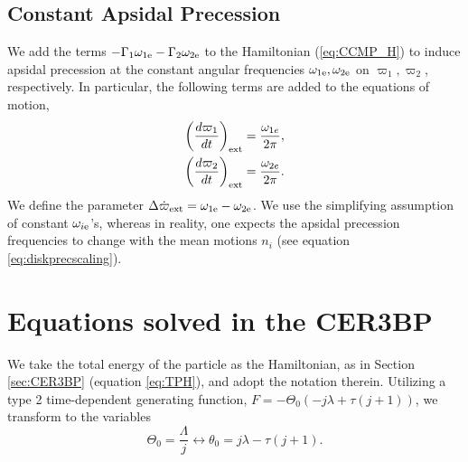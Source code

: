 \documentclass[usenatbib,twocolumn]{mnras}
\begin{document}
\subsection{Constant Apsidal Precession}
We add the terms $-\Gamma_1\omega_{1\rm e}-\Gamma_2\omega_{2\rm e}$ to the Hamiltonian (\ref{eq:CCMP_H}) to induce apsidal precession at the constant angular frequencies $\omega_{1\rm e},\omega_{2\rm e}$ on $\varpi_1,\varpi_2$, respectively. In particular, the following terms are added to the equations of motion,
\begin{align}
    \left(\frac{d\varpi_1 }{dt}\right)_{\rm ext} = \frac{\omega_{1e}}{2\pi}, \\
    \left(\frac{d\varpi_2 }{dt}\right)_{\rm ext} = \frac{\omega_{2e}}{2\pi}.
\end{align}
We define the parameter $\Delta\dot\varpi_{\rm ext} = \omega_{1\rm e}-\omega_{2\rm e}$.
We use the simplifying assumption of constant $\omega_{i\rm e}$'s, whereas in reality, one expects the apsidal precession frequencies to change with the mean motions $n_i$ (see equation \ref{eq:diskprecscaling}).




\clearpage


\clearpage
\onecolumn
\appendix
\section{Equations solved in the CER3BP}
We take the total energy of the particle as the Hamiltonian, as in Section \ref{sec:CER3BP} (equation \ref{eq:TPH}), and adopt the notation therein.
Utilizing a type 2 time-dependent generating function, $F=- \Theta_{0} \left(- j \lambda + \tau \left(j + 1\right)\right)$, we transform to the variables
\begin{equation}
    \Theta_{0} = \frac{\Lambda}{j} \longleftrightarrow
    \theta_0 = j \lambda - \tau \left(j + 1\right).
\end{equation}
\end{document}
